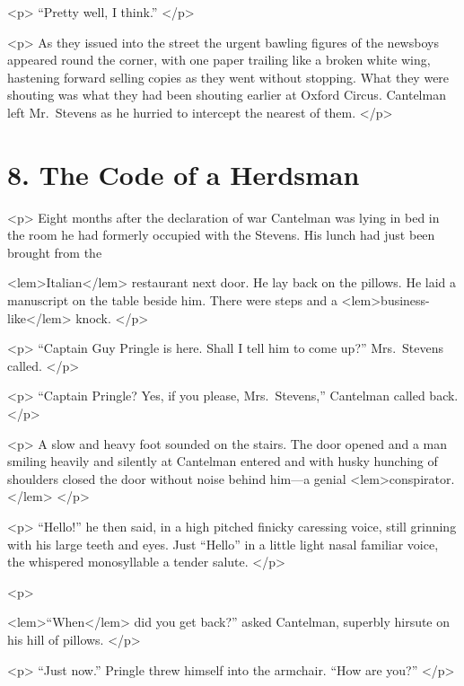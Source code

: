 {{				<p>
				“Pretty well, I think.” 
 				</p> 

				<p>
				As they issued into the street the urgent bawling figures of the newsboys appeared 
				round the corner, with one paper trailing like a broken white wing, hastening forward 
				selling copies as they went without stopping. What they were shouting was what they had 
				been shouting earlier at Oxford Circus. Cantelman left Mr.\ Stevens as he hurried to 
				intercept the nearest of them. 
				</p> 

\newpage %

	\section*{8. The Code of a Herdsman}

				<p>
Eight months after the declaration of war Cantelman was lying in bed in the room he 
				had formerly occupied with the Stevens. His lunch had just been brought from the 
				
<lem>Italian</lem>{} restaurant next door. He lay back on the pillows. He laid a manuscript on the 
				table beside him. There were steps and a 
<lem>business-like</lem>{} knock. 
 				</p> 

				<p>
				“Captain Guy Pringle is here. Shall I tell him to come up?” Mrs.\ Stevens called. 
 				</p> 

				<p>
				“Captain Pringle? Yes, if you please, Mrs.\ Stevens,” Cantelman called back. 
 				</p> 

				<p>
				A slow and heavy foot sounded on the stairs. The door opened and a man smiling 
				heavily and silently at Cantelman entered and with husky hunching of shoulders 
				closed the door without noise behind him---a genial 
<lem>conspirator.</lem>
					{} 
 				</p> 

				<p>
				“Hello!” he then said, in a high pitched finicky caressing voice, still grinning 
				with his large teeth and eyes. Just “Hello” in a little light nasal familiar voice, 
				the whispered monosyllable a tender salute. 
 				</p> 

				<p>
				
<lem>“When</lem> 
					{}
				did you get back?” asked Cantelman, superbly hirsute on his hill of pillows. 
 				</p> 

				<p>
				“Just now.” Pringle threw himself into the armchair. “How are you?” 
 				</p> 

}}
